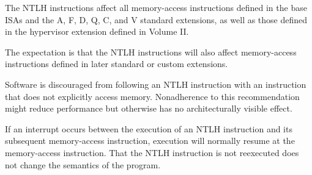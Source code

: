 The NTLH instructions affect all memory-access instructions defined in the
base ISAs and the A, F, D, Q, C, and V standard extensions,
as well as those defined in the hypervisor extension defined in Volume II.

\begin{commentary}
The expectation is that the NTLH instructions will also affect memory-access
instructions defined in later standard or custom extensions.
\end{commentary}

Software is discouraged from following an NTLH instruction with an
instruction that does not explicitly access memory.
Nonadherence to this recommendation might reduce performance but
otherwise has no architecturally visible effect.

\begin{commentary}
If an interrupt occurs between the execution of an NTLH instruction and its
subsequent memory-access instruction, execution will normally resume at the
memory-access instruction.
That the NTLH instruction is not reexecuted does not change the semantics of
the program.
\end{commentary}
